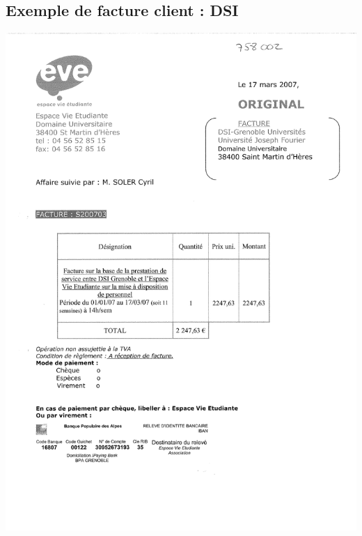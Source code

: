 \subsection{Exemple de facture client : DSI}
\begin{center}
\includegraphics[scale=0.7]{annexes/images/facture_client_dsi.pdf}
\end{center}
